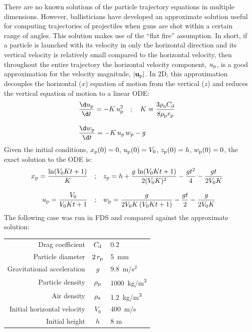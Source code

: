 \documentclass[11pt]{book}
\begin{document}
There are no known solutions of the particle trajectory equations in multiple dimensions. However, ballisticians have developed an approximate solution useful for computing trajectories of projectiles when guns are shot within a certain range of angles. This solution makes use of the ``flat fire'' assumption. In short, if a particle is launched with its velocity in only the horizontal direction and its vertical velocity is relatively small compared to the horizontal velocity, then throughout the entire trajectory the horizontal velocity component, $u_{\rm p}$, is a good approximation for the velocity magnitude, $|\mathbf{u_{\rm p}}|$. In 2D, this approximation decouples the horizontal ($x$) equation of motion from the vertical ($z$) and reduces the vertical equation of motion to a linear ODE:
\begin{align}
   &\frac{\d u_{\rm p}}{\d t} = -K \, u_{\rm p}^2 \quad ;  \quad K \equiv \frac{3 \rho_{\rm a} C_{\rm d}}{8 \rho_{\rm p} r_{\rm p}} \\[.1in]
   &\frac{\d w_{\rm p}}{\d t} = -K \, u_{\rm p} \, w_{\rm p} - g
\end{align}
Given the initial conditions, $x_{\rm p}(0) = 0$, $u_{\rm p}(0) = V_0$, $z_{\rm p}(0) = h$, $w_{\rm p}(0) = 0$, the exact solution to the ODE is:
\begin{align}
    x_{\rm p} = \frac{\ln(V_0 K t + 1)}{K} \quad ;& \quad
    z_{\rm p} = h + \frac{g \, \ln(V_0 K t + 1)}{2 (V_0 K)^2} - \frac{g t^2}{4} - \frac{g t}{2 V_0 K} \\[.1in]
    u_{\rm p} = \frac{V_0}{V_0 K t + 1} \quad ;& \quad w_{\rm p} = \frac{g}{2 V_0 K \, (V_0 K t + 1)} - \frac{g t}{2} - \frac{g}{2 V_0 K}
\end{align}
The following case was run in FDS and compared against the approximate solution:
\begin{center}
\begin{tabular}{|r|c|l|}
\hline
Drag coefficient                  & $C_{\rm d}$          & 0.2 \\
Particle diameter                 & $2\, r_{\rm p}$      & 5~mm \\
Gravitational acceleration        & $g$                  & 9.8~m/s$^2$ \\
Particle density                  & $\rho_{\rm p}$       & 1000~\si{kg/m^3} \\
Air density                       & $\rho_{\rm a}$       & 1.2~\si{kg/m^3} \\
Initial horizontal velocity       & $V_0$                & 400~m/s \\
Initial height                    & $h$                  & 8 m \\
\hline
\end{tabular}
\end{center}
\end{document}
